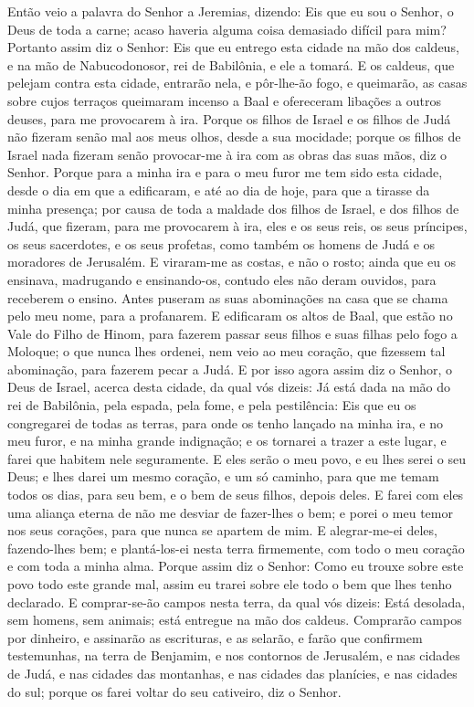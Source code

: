 Então veio a palavra do Senhor a Jeremias, dizendo: Eis
que eu sou o Senhor, o Deus de toda a carne; acaso haveria alguma
coisa demasiado difícil para mim? Portanto assim diz o
Senhor: Eis que eu entrego esta cidade na mão dos caldeus, e na mão
de Nabucodonosor, rei de Babilônia, e ele a tomará. E os
caldeus, que pelejam contra esta cidade, entrarão nela, e pôr-lhe-ão
fogo, e queimarão, as casas sobre cujos terraços queimaram incenso a
Baal e ofereceram libações a outros deuses, para me provocarem à
ira. Porque os filhos de Israel e os filhos de Judá não
fizeram senão mal aos meus olhos, desde a sua mocidade; porque os
filhos de Israel nada fizeram senão provocar-me à ira com as obras
das suas mãos, diz o Senhor. Porque para a minha ira e para o
meu furor me tem sido esta cidade, desde o dia em que a edificaram,
e até ao dia de hoje, para que a tirasse da minha presença;
por causa de toda a maldade dos filhos de Israel, e dos
filhos de Judá, que fizeram, para me provocarem à ira, eles e os
seus reis, os seus príncipes, os seus sacerdotes, e os seus
profetas, como também os homens de Judá e os moradores de Jerusalém.
E viraram-me as costas, e não o rosto; ainda que eu os
ensinava, madrugando e ensinando-os, contudo eles não deram ouvidos,
para receberem o ensino. Antes puseram as suas abominações na
casa que se chama pelo meu nome, para a profanarem. E
edificaram os altos de Baal, que estão no Vale do Filho de Hinom,
para fazerem passar seus filhos e suas filhas pelo fogo a Moloque; o
que nunca lhes ordenei, nem veio ao meu coração, que fizessem tal
abominação, para fazerem pecar a Judá. E por isso agora assim
diz o Senhor, o Deus de Israel, acerca desta cidade, da qual vós
dizeis: Já está dada na mão do rei de Babilônia, pela espada, pela
fome, e pela pestilência: Eis que eu os congregarei de todas
as terras, para onde os tenho lançado na minha ira, e no meu furor,
e na minha grande indignação; e os tornarei a trazer a este lugar, e
farei que habitem nele seguramente. E eles serão o meu povo,
e eu lhes serei o seu Deus; e lhes darei um mesmo coração, e
um só caminho, para que me temam todos os dias, para seu bem, e o
bem de seus filhos, depois deles. E farei com eles uma
aliança eterna de não me desviar de fazer-lhes o bem; e porei o meu
temor nos seus corações, para que nunca se apartem de mim. E
alegrar-me-ei deles, fazendo-lhes bem; e plantá-los-ei nesta terra
firmemente, com todo o meu coração e com toda a minha alma.
Porque assim diz o Senhor: Como eu trouxe sobre este povo
todo este grande mal, assim eu trarei sobre ele todo o bem que lhes
tenho declarado. E comprar-se-ão campos nesta terra, da qual
vós dizeis: Está desolada, sem homens, sem animais; está entregue na
mão dos caldeus. Comprarão campos por dinheiro, e assinarão
as escrituras, e as selarão, e farão que confirmem testemunhas, na
terra de Benjamim, e nos contornos de Jerusalém, e nas cidades de
Judá, e nas cidades das montanhas, e nas cidades das planícies, e
nas cidades do sul; porque os farei voltar do seu cativeiro, diz o
Senhor.

